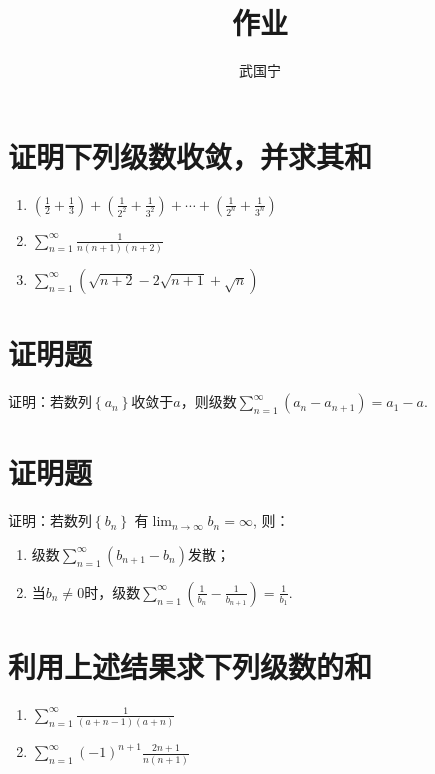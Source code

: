 \documentclass[a4paper,12pt]{article}
\begin{document}
\title{作业}
\author{武国宁}
\date{}
\maketitle

\section{证明下列级数收敛，并求其和}
\begin{enumerate}[label={\rm(\arabic*)}]
    \item $\displaystyle \left(\frac{1}{2} + \frac{1}{3}\right) + 
        \left(\frac{1}{2^2} + \frac{1}{3^2}\right) + \cdots + 
        \left(\frac{1}{2^n} + \frac{1}{3^n}\right)$
    \item$ \displaystyle \sum_{n=1}^{\infty} \frac{1}{n(n+1)(n+2)}$ 
    \item$ \displaystyle \sum_{n=1}^{\infty} \left(\sqrt{n+2} - 2\sqrt{n+1}
        + \sqrt{n} \right)$ 
\end{enumerate}

\section{证明题}
证明：若数列$\left\{a_n\right\}$收敛于$a$，则级数$\displaystyle \sum_{n=1}^{\infty} \left( a_n - 
a_{n+1}\right) = a_1 - a$.  
\section{证明题}
证明：若数列$\left\{b_n\right\}$ 有$ \displaystyle \lim_{n \to \infty} b_n = \infty$, 则：
\begin{enumerate}[label={\rm(\arabic*)}]
    \item 级数$\displaystyle \sum_{n=1}^{\infty} \left(b_{n+1} - b_n\right)$发散；
    \item 当$\displaystyle b_n \ne 0$时，级数$\displaystyle \sum_{n = 1} ^{\infty} 
        \left( \frac{1}{b_n} - \frac{1}{b_{n+1}}\right) = \frac{1}{b_1}$.
\end{enumerate}
\section{利用上述结果求下列级数的和}
\begin{enumerate}[label={\rm(\arabic*)}]
    \item $\displaystyle \sum_{n=1}^{\infty} \frac{1}{(a+n-1)(a+n)}$
    \item $\displaystyle \sum_{n=1}^{\infty} (-1)^{n+1} \frac{2n+1}{n(n+1)}$
\end{enumerate}
\end{document}

